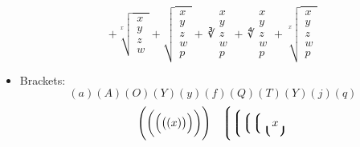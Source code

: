 \documentclass { article }
\begin{document}
\begin{itemize}
\[          + \sqrt[x]   { \begin{matrix} x \\ y \\ z \\ w \end{matrix} }
          + \sqrt      { \begin{matrix} x \\ y \\ z \\ w \\ p \end{matrix} }
          + \cuberoot  { \begin{matrix} x \\ y \\ z \\ w \\ p \end{matrix} }
          + \fourthroot{ \begin{matrix} x \\ y \\ z \\ w \\ p \end{matrix} }
          + \sqrt[x]   { \begin{matrix} x \\ y \\ z \\ w \\ p \end{matrix} }
        \]
  \item Brackets:
        \[ (a) (A) (O) (Y) (y) (f) (Q) (T) (Y) (j) (q) \]
        \[
          \Biggl(  \biggl(  \Bigl(  \bigl(   (x)  \bigr)  \Bigr)  \biggr)  \Biggr)  \quad
          \Biggl\lgroup \biggl\lgroup \Bigl\lgroup  \bigl\lgroup  \lgroup x \rgroup
\]
\end{itemize}
\end{document}

